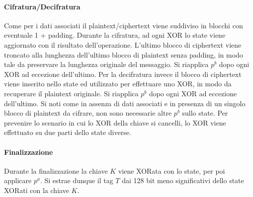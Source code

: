 \paragraph*{Cifratura/Decifratura}
Come per i dati associati il plaintext/ciphertext viene suddiviso in blocchi con eventuale 1 + padding. Durante la cifratura, ad ogni XOR lo state viene aggiornato con il risultato dell'operazione. L'ultimo blocco di ciphertext viene troncato alla lunghezza dell'ultimo blocco di plaintext senza padding, in modo tale da preservare la lunghezza originale del messaggio. Si riapplica $p^b$ dopo ogni XOR ad eccezione dell'ultimo. 
\newline\newline
Per la decifratura invece il blocco di ciphertext viene inserito nello state ed utilizzato per effettuare uno XOR, in modo da recuperare il plaintext originale. Si riapplica $p^b$ dopo ogni XOR ad eccezione dell'ultimo. 
\newline\newline
Si noti come in assenza di dati associati e in presenza di un singolo blocco di plaintext da cifrare, non sono necessarie altre $p^b$ sullo state. Per prevenire lo scenario in cui lo XOR della chiave si cancelli, lo XOR viene effettuato su due parti dello state diverse. 
\paragraph*{Finalizzazione}
Durante la finalizzazione la chiave $K$ viene XORata con lo state, per poi applicare $p^a$. Si estrae dunque il tag $T$ dai 128 bit meno significativi dello state XORati con la chiave $K$. 
